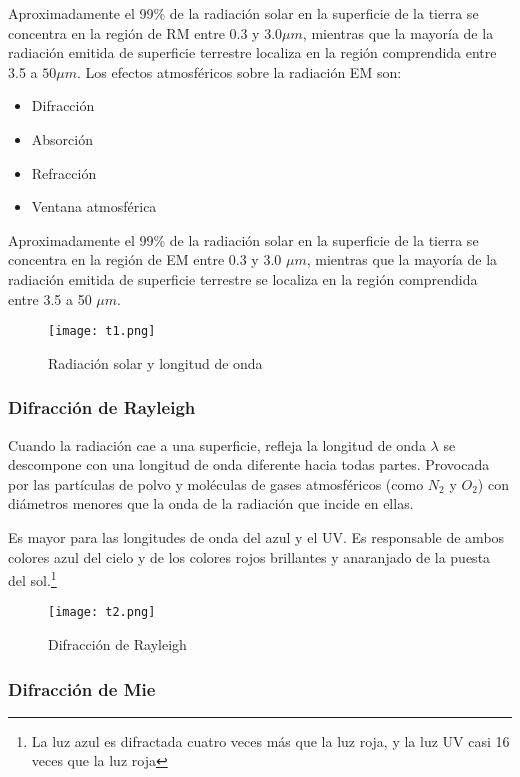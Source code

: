 Aproximadamente el 99\% de la radiación solar en la superficie de la tierra se concentra en la región de RM entre 0.3 y $3.0\mu m$, mientras que la mayoría de la radiación emitida de superficie terrestre localiza en la región comprendida entre 3.5 a $50\mu m$.
Los efectos atmosféricos sobre la radiación EM son:
\begin{itemize}
    \item Difracción 
    \item Absorción
    \item Refracción
    \item Ventana atmosférica
\end{itemize}

Aproximadamente el 99\% de la radiación solar en la superficie de la tierra se concentra en la región de EM entre 0.3 y 3.0 $\mu m$,
mientras que la mayoría de la radiación emitida de superficie terrestre se localiza en la región comprendida entre 3.5 a 50 $\mu m$.

\begin{figure}[h!]
  \centerline{\texttt{[image: t1.png]}}
  \caption{Radiación solar y longitud de onda}
  \label{t1}
\end{figure}

\subsubsection{Difracción de Rayleigh}
Cuando la radiación cae a una superficie, refleja la longitud de onda $\lambda$ se descompone con una longitud de onda diferente hacia todas partes. Provocada por las partículas de polvo y moléculas de gases atmosféricos (como $N_2$ y $O_2$) con diámetros menores que la onda de la radiación que incide en ellas.

Es mayor para las longitudes de onda del azul y el UV. Es responsable de ambos colores azul del cielo y de los colores rojos brillantes y anaranjado de la puesta del sol.\footnote{La luz azul es difractada cuatro veces más que la luz roja, y la luz UV casi 16 veces que la luz roja}

\begin{figure}[h!]
  \centerline{\texttt{[image: t2.png]}}
  \caption{Difracción de Rayleigh}
  \label{t2}
\end{figure}

\subsubsection{Difracción de Mie}

